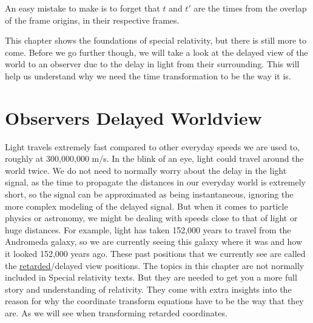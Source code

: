 An easy mistake to make is to forget that ${t}$ and ${t{'}}$ are the times from the overlap of the frame origins, in their respective frames.

This chapter shows the foundations of special relativity, but there is still more to come.
Before we go further though, we will take a look at the delayed view of the world to an observer due to the delay in light from their surrounding.
This will help us understand why we need the time transformation to be the way it is.



\printbibliography[segment=\therefsegment, heading=subbibliography]

\chapter{Observers Delayed Worldview} \label{ch: Observers Delayed Worldview}

Light travels extremely fast compared to other everyday speeds we are used to, roughly at 300,000,000 m/s.
In the blink of an eye, light could travel around the world twice.
We do not need to normally worry about the delay in the light signal, as the time to propagate the distances in our everyday world is extremely short, so the signal can be approximated as being instantaneous, ignoring the more complex modeling of the delayed signal.
But when it comes to particle physics or astronomy, we might be dealing with speeds close to that of light or huge distances.
For example, light has taken 152,000 years to travel from the Andromeda galaxy, so we are currently seeing this galaxy where it was and how it looked 152,000 years ago.
These past positions that we currently see are called the \hyperlink{def-retarded-position}{retarded}/delayed view positions.
The topics in this chapter are not normally included in Special relativity texts.
But they are needed to get you a more full story and understanding of relativity.
They come with extra insights into the reason for why the coordinate transform equations have to be the way that they are.
As we will see when transforming retarded coordinates.

